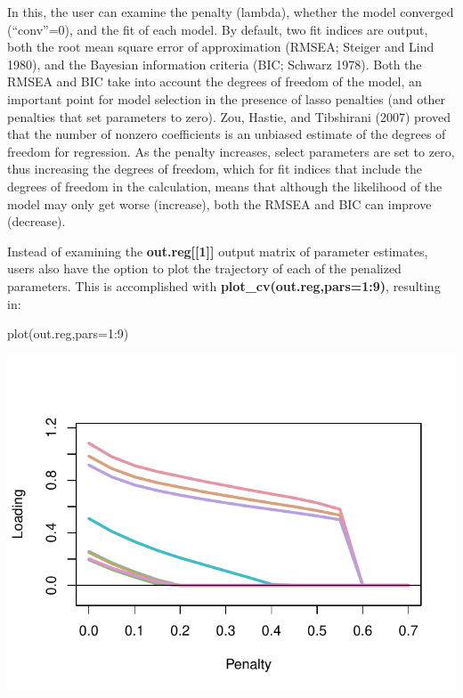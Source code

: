 In this, the user can examine the penalty (lambda), whether the model
converged (``conv''=0), and the fit of each model. By default, two fit
indices are output, both the root mean square error of approximation
(RMSEA; Steiger and Lind 1980), and the Bayesian information criteria
(BIC; Schwarz 1978). Both the RMSEA and BIC take into account the
degrees of freedom of the model, an important point for model selection
in the presence of lasso penalties (and other penalties that set
parameters to zero). Zou, Hastie, and Tibshirani (2007) proved that the
number of nonzero coefficients is an unbiased estimate of the degrees of
freedom for regression. As the penalty increases, select parameters are
set to zero, thus increasing the degrees of freedom, which for fit
indices that include the degrees of freedom in the calculation, means
that although the likelihood of the model may only get worse (increase),
both the RMSEA and BIC can improve (decrease).

Instead of examining the \textbf{out.reg[[1]]} output matrix of
parameter estimates, users also have the option to plot the trajectory
of each of the penalized parameters. This is accomplished with
\textbf{plot_cv(out.reg,pars=1:9)}, resulting in:

\begin{Schunk}
\begin{Sinput}
plot(out.reg,pars=1:9)
\end{Sinput}

\includegraphics{draft1_files/figure-latex/unnamed-chunk-6-1} \end{Schunk}

